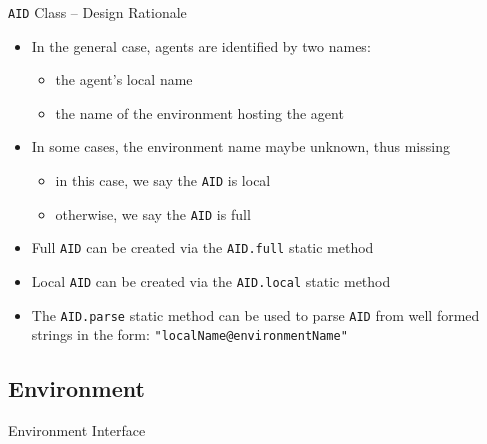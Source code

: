 \documentclass[presentation]{beamer}\mode<presentation>{\usetheme{AMSCesenaPurpleAndGold}}
\begin{document}
\begin{frame}{\texttt{AID} Class -- Design Rationale}

	\begin{itemize}

		\item In the general case, agents are identified by two names:
		\begin{itemize}
			\item the agent's \alert{local} name
			\item the name of the environment hosting the agent
		\end{itemize}

		\vfill

		\item In some cases, the environment name maybe unknown, thus missing
		\begin{itemize}
			\item in this case, we say the \texttt{AID} is \alert{local}
			\item otherwise, we say the \texttt{AID} is \alert{full}
		\end{itemize}

		\vfill

		\item Full \texttt{AID} can be created via the \texttt{AID.full} \alert{static} method

		\vfill

		\item Local \texttt{AID} can be created via the \texttt{AID.local} \alert{static} method

		\vfill

		\item The \texttt{AID.parse} \alert{static} method can be used to parse \texttt{AID} from well formed strings in the form: \texttt{"localName@environmentName"}
	\end{itemize}

\end{frame}

\subsection{Environment}

\begin{frame}[allowframebreaks]{Environment Interface}

    

\end{frame}
\end{document}

